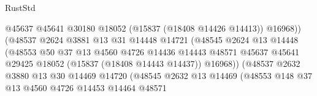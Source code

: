 \begin{lexlean}{RustStd}
\begin{coremodule}
                                          @45637
                                          @45641
                                          @30180
                                          @18052
                                          (@15837 (@18408 @14426 @14413))
                                          @16968))
                                      (@48537
                                        @2624
                                        @3881
                                        @13
                                        @31
                                        @14448
                                        @14721
                                        (@48545
                                          @2624
                                          @13
                                          @14448
                                          (@48553
                                            @50
                                            @37
                                            @13
                                            @4560
                                            @4726
                                            @14436
                                            @14443
                                            @48571
                                            @45637
                                            @45641
                                            @29425
                                            @18052
                                            (@15837 (@18408 @14443 @14437))
                                            @16968))
                                        (@48537
                                          @2632
                                          @3880
                                          @13
                                          @30
                                          @14469
                                          @14720
                                          (@48545
                                            @2632
                                            @13
                                            @14469
                                            (@48553
                                              @148
                                              @37
                                              @13
                                              @4560
                                              @4726
                                              @14453
                                              @14464
                                              @48571

\end{coremodule}
\end{lexlean}
